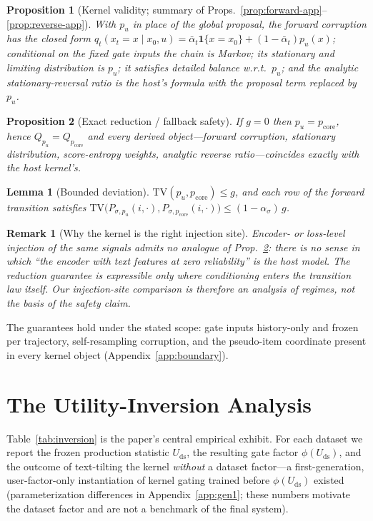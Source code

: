 \documentclass[letterpaper]{article}
\newcommand{\pcore}{p_{\mathrm{core}}}
\newcommand{\pu}{p_{u}}
\newcommand{\Uds}{U_{\mathrm{ds}}}
\newcommand{\phids}{\phi(\Uds)}
\newcommand{\TV}{\mathrm{TV}}
\newtheorem{proposition}{Proposition}
\newtheorem{lemma}{Lemma}
\newtheorem{remark}{Remark}
\begin{document}
\begin{proposition}[Kernel validity; summary of
Props.~\ref{prop:forward-app}--\ref{prop:reverse-app}]
\label{prop:validity}
With $\pu$ in place of the global proposal, the forward corruption has
the closed form
$q_t(x_t{=}x \mid x_0,u)=\bar\alpha_t\mathbf{1}\{x{=}x_0\}
+(1-\bar\alpha_t)\pu(x)$; conditional on the fixed gate inputs the
chain is Markov; its stationary and limiting distribution is $\pu$; it
satisfies detailed balance w.r.t.\ $\pu$; and the analytic
stationary-reversal ratio is the host's formula with the proposal term
replaced by $\pu$.
\end{proposition}
\begin{proposition}[Exact reduction / fallback safety]
\label{prop:reduction}
If $g=0$ then $\pu=\pcore$, hence $Q_{\pu}=Q_{\pcore}$ and every
derived object---forward corruption, stationary distribution,
score-entropy weights, analytic reverse ratio---coincides exactly with
the host kernel's.
\end{proposition}
\begin{lemma}[Bounded deviation]
\label{lem:tv}
$\TV(\pu,\pcore)\le g$, and each row of the forward transition
satisfies
$\TV\big(P_{\sigma,\pu}(i,\cdot),P_{\sigma,\pcore}(i,\cdot)\big)\le
(1-\alpha_\sigma)\,g$.
\end{lemma}
\begin{remark}[Why the kernel is the right injection site]
\label{rem:site}
Encoder- or loss-level injection of the same signals admits no analogue
of Prop.~\ref{prop:reduction}: there is no sense in which ``the encoder
with text features at zero reliability'' \emph{is} the host model. The
reduction guarantee is expressible only where conditioning enters the
transition law itself. Our injection-site comparison is therefore an
analysis of regimes, not the basis of the safety claim.
\end{remark}
The guarantees hold under the stated scope: gate inputs history-only
and frozen per trajectory, self-resampling corruption, and the
pseudo-item coordinate present in every kernel object
(Appendix~\ref{app:boundary}).

\section{The Utility-Inversion Analysis}
\label{sec:inversion}

Table~\ref{tab:inversion} is the paper's central empirical exhibit. For
each dataset we report the frozen production statistic $\Uds$, the
resulting gate factor $\phids$, and the outcome of text-tilting the
kernel \emph{without} a dataset factor---a first-generation,
user-factor-only instantiation of kernel gating trained before $\phids$
existed (parameterization differences in Appendix~\ref{app:gen1};
these numbers motivate the dataset factor and are not a benchmark of
the final system).
\end{document}
